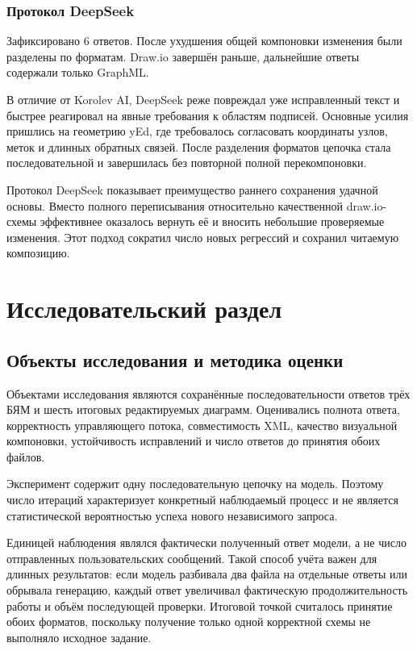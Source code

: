 \documentclass[a4paper,12pt]{extreport}
\begin{document}
\subsection{Протокол DeepSeek}

Зафиксировано 6 ответов. После ухудшения общей компоновки изменения были разделены по форматам. Draw.io завершён раньше, дальнейшие ответы содержали только GraphML.

В отличие от Korolev AI, DeepSeek реже повреждал уже исправленный текст и быстрее реагировал на явные требования к областям подписей. Основные усилия пришлись на геометрию yEd, где требовалось согласовать координаты узлов, меток и длинных обратных связей. После разделения форматов цепочка стала последовательной и завершилась без повторной полной перекомпоновки.

Протокол DeepSeek показывает преимущество раннего сохранения удачной основы. Вместо полного переписывания относительно качественной draw.io-схемы эффективнее оказалось вернуть её и вносить небольшие проверяемые изменения. Этот подход сократил число новых регрессий и сохранил читаемую композицию.

\chapter{Исследовательский раздел}

\section{Объекты исследования и методика оценки}

Объектами исследования являются сохранённые последовательности ответов трёх БЯМ и шесть итоговых редактируемых диаграмм. Оценивались полнота ответа, корректность управляющего потока, совместимость XML, качество визуальной компоновки, устойчивость исправлений и число ответов до принятия обоих файлов.

Эксперимент содержит одну последовательную цепочку на модель. Поэтому число итераций характеризует конкретный наблюдаемый процесс и не является статистической вероятностью успеха нового независимого запроса.

Единицей наблюдения являлся фактически полученный ответ модели, а не число отправленных пользовательских сообщений. Такой способ учёта важен для длинных результатов: если модель разбивала два файла на отдельные ответы или обрывала генерацию, каждый ответ увеличивал фактическую продолжительность работы и объём последующей проверки. Итоговой точкой считалось принятие обоих форматов, поскольку получение только одной корректной схемы не выполняло исходное задание.
\end{document}
